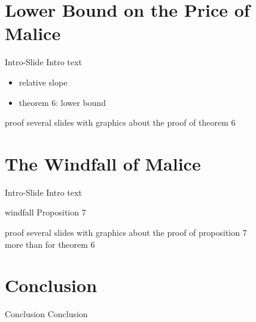 \documentclass{beamer}
\begin{document}
\section{Lower Bound on the Price of Malice}

\begin{frame}{Intro-Slide}
	Intro text
\end{frame}

\begin{frame}
	\begin{itemize}
		\item relative slope
		\item theorem 6: lower bound
	\end{itemize}
\end{frame}

\begin{frame}{proof}
	several slides with graphics about the proof of theorem 6
\end{frame}


\section{The Windfall of Malice}

\begin{frame}{Intro-Slide}
	Intro text
\end{frame}

\begin{frame}{windfall}
	Proposition 7
\end{frame}

\begin{frame}{proof}
	several slides with graphics about the proof of proposition 7 \\
	more than for theorem 6
\end{frame}


\section{Conclusion}
\begin{frame}{Conclusion}
	Conclusion
\end{frame}
\end{document}

